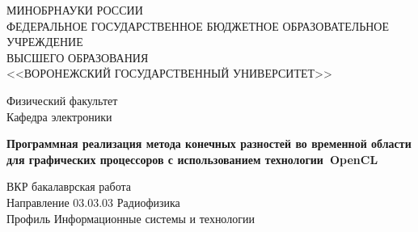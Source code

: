 \begin{titlepage}

\centering
\begingroup
\fontsize{12pt}{12pt}\selectfont
МИНОБРНАУКИ РОССИИ\\
\endgroup
\begingroup
\fontsize{11pt}{11pt}\selectfont
ФЕДЕРАЛЬНОЕ ГОСУДАРСТВЕННОЕ БЮДЖЕТНОЕ ОБРАЗОВАТЕЛЬНОЕ УЧРЕЖДЕНИЕ\\
ВЫСШЕГО ОБРАЗОВАНИЯ\\
\endgroup
\begingroup
\fontsize{12pt}{12pt}\selectfont
<<ВОРОНЕЖСКИЙ ГОСУДАРСТВЕННЫЙ УНИВЕРСИТЕТ>>\\

\vspace{20mm}

Физический факультет\\
Кафедра электроники\\
\endgroup
\vspace{25mm}

\textbf{
Программная реализация метода конечных разностей во временной области для графических процессоров с использованием технологии~OpenCL}

\vspace{25mm}
\begingroup
\fontsize{12pt}{12pt}\selectfont
ВКР бакалаврская работа\\
Направление 03.03.03 Радиофизика\\
Профиль Информационные системы и технологии\\

\vspace{30mm}


\end{titlepage}

